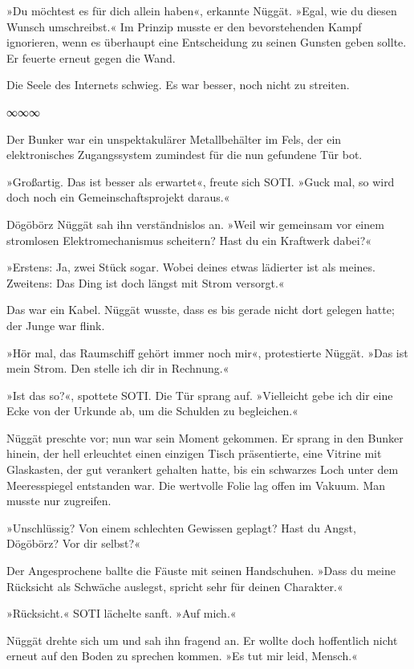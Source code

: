 »Du möchtest es für dich allein haben«, erkannte Nüggät. »Egal, wie du diesen Wunsch umschreibst.« Im Prinzip musste er den bevorstehenden Kampf ignorieren, wenn es überhaupt eine Entscheidung zu seinen Gunsten geben sollte. Er feuerte erneut gegen die Wand.

Die Seele des Internets schwieg. Es war besser, noch nicht zu streiten.

\begin{center}
∞∞∞
\end{center}

Der Bunker war ein unspektakulärer Metallbehälter im Fels, der ein elektronisches Zugangssystem zumindest für die nun gefundene Tür bot.

»Großartig. Das ist besser als erwartet«, freute sich SOTI. »Guck mal, so wird doch noch ein Gemeinschaftsprojekt daraus.«

Dögöbörz Nüggät sah ihn verständnislos an. »Weil wir gemeinsam vor einem stromlosen Elektromechanismus scheitern? Hast du ein Kraftwerk dabei?«

»Erstens: Ja, zwei Stück sogar. Wobei deines etwas lädierter ist als meines. Zweitens: Das Ding ist doch längst mit Strom versorgt.«

Das war ein Kabel. Nüggät wusste, dass es bis gerade nicht dort gelegen hatte; der Junge war flink.

»Hör mal, das Raumschiff gehört immer noch mir«, protestierte Nüggät. »Das ist mein Strom. Den stelle ich dir in Rechnung.«

»Ist das so?«, spottete SOTI. Die Tür sprang auf. »Vielleicht gebe ich dir eine Ecke von der Urkunde ab, um die Schulden zu begleichen.«

Nüggät preschte vor; nun war sein Moment gekommen. Er sprang in den Bunker hinein, der hell erleuchtet einen einzigen Tisch präsentierte, eine Vitrine mit Glaskasten, der gut verankert gehalten hatte, bis ein schwarzes Loch unter dem Meeresspiegel entstanden war. Die wertvolle Folie lag offen im Vakuum. Man musste nur zugreifen.

»Unschlüssig? Von einem schlechten Gewissen geplagt? Hast du Angst, Dögöbörz? Vor dir selbst?«

Der Angesprochene ballte die Fäuste mit seinen Handschuhen. »Dass du meine Rücksicht als Schwäche auslegst, spricht sehr für deinen Charakter.«

»Rücksicht.« SOTI lächelte sanft. »Auf mich.«

Nüggät drehte sich um und sah ihn fragend an. Er wollte doch hoffentlich nicht erneut auf den Boden zu sprechen kommen. »Es tut mir leid, Mensch.«

